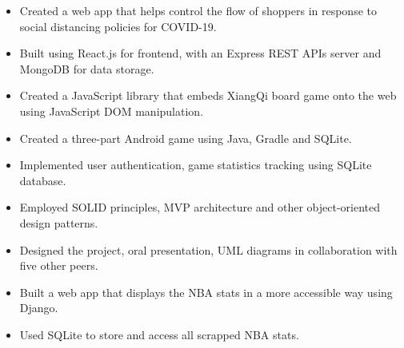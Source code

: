 


\vspace{5pt}

\begin{itemize}
	\item Created a web app that helps control the flow of shoppers in response to social distancing policies for COVID-19.
	\item Built using React.js for frontend, with an Express REST APIs server and MongoDB for data storage.
\end{itemize}

\divider


\vspace{5pt}

\begin{itemize}
	\item Created a JavaScript library that embeds XiangQi board game onto the web using JavaScript DOM manipulation.
\end{itemize}

\divider


\vspace{5pt}

\begin{itemize}
	\item Created a three-part Android game using Java, Gradle and SQLite.
    \item Implemented user authentication, game statistics tracking using SQLite database.
    \item Employed SOLID principles, MVP architecture and other object-oriented design patterns.
	\item Designed the project, oral presentation, UML diagrams in collaboration with five other peers.
\end{itemize}

\divider


\vspace{5pt}

\begin{itemize}
	\item Built a web app that displays the NBA stats in a more accessible way using Django.
    \item Used SQLite to store and access all scrapped NBA stats.
\end{itemize}

